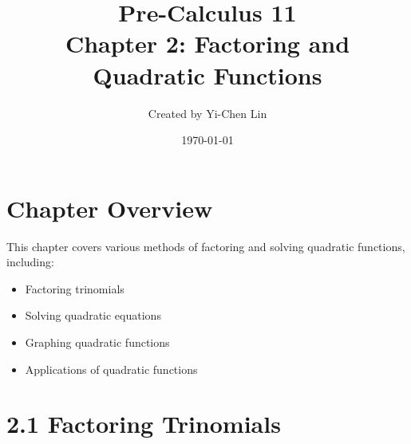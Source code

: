 \documentclass[12pt]{article}
\title{Pre-Calculus 11 \\ Chapter 2: Factoring and Quadratic Functions}
\author{Created by Yi-Chen Lin}
\date{\today}
\begin{document}
\maketitle

\section*{Chapter Overview}
This chapter covers various methods of factoring and solving quadratic functions, including:
\begin{itemize}
    \item Factoring trinomials
    \item Solving quadratic equations
    \item Graphing quadratic functions
    \item Applications of quadratic functions
\end{itemize}

\section{2.1 Factoring Trinomials}
\end{document}
